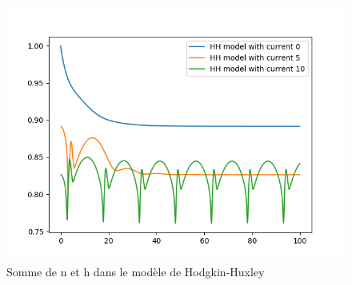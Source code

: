 \documentclass[12pt]{scrartcl}
\begin{document}
\begin{figure}[!h]
\centering
\includegraphics[scale=0.5]{imgs/hhnplush.png}
\caption{Somme de n et h dans le modèle de Hodgkin-Huxley}
\label{hhnplush}
\end{figure}
\end{document}
